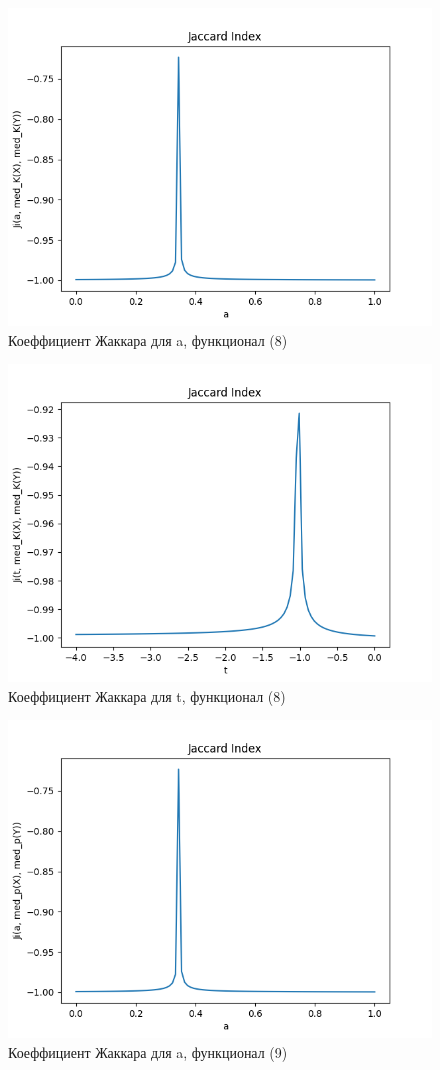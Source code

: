 \documentclass[10pt]{article}
\begin{document}
\begin{figure}[h!]
    \centering
    \includegraphics[width=0.75\linewidth]{Jaccadrd-a-med_K.png}
    \caption{Коеффициент Жаккара для a, функционал (8)}
\end{figure}

\newpage
\begin{figure}[h!]
    \centering
    \includegraphics[width=0.75\linewidth]{Jaccadrd-t-med_K.png}
    \caption{Коеффициент Жаккара для t, функционал (8)}
\end{figure}

\begin{figure}[h!]
    \centering
    \includegraphics[width=0.75\linewidth]{Jaccadrd-a-med_p.png}
    \caption{Коеффициент Жаккара для a, функционал (9)}
\end{figure}
\end{document}

